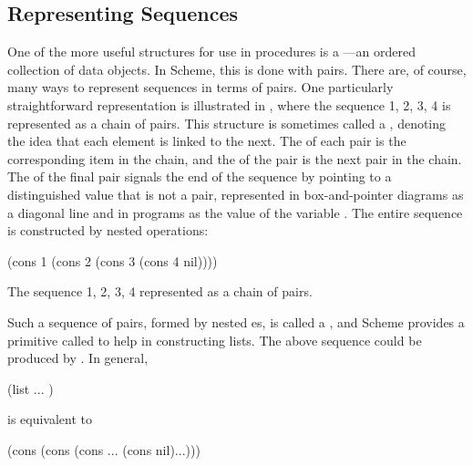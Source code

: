 \subsection{Representing Sequences}
\label{Section 2.2.1}

One of the more useful structures for use in procedures is a
---an ordered collection of data objects.  In Scheme, this is
done with pairs.  There are, of course, many ways to represent sequences in
terms of pairs.  One particularly straightforward representation is illustrated
in , where the sequence 1, 2, 3, 4 is represented as a chain
of pairs.  This structure is sometimes called a , denoting
the idea that each element is linked to the next.  The  of each pair
is the corresponding item in the chain, and the  of the pair is the
next pair in the chain.  The  of the final pair signals the end of
the sequence by pointing to a distinguished value that is not a pair,
represented in box-and-pointer diagrams as a diagonal line and in programs as
the value of the variable .  The entire sequence is constructed by
nested  operations:

\begin{codeBlock}
(cons 1
      (cons 2
            (cons 3
                  (cons 4 nil))))
\end{codeBlock}

\begin{imageFigure}{The sequence 1, 2, 3, 4 represented as a chain of pairs.}
  
\end{imageFigure}

Such a sequence of pairs, formed by nested es, is called a
, and Scheme provides a primitive called  to help in
constructing lists.  The above sequence could be produced by
.  In general,

\begin{syntaxForm}
(list   ... )
\end{syntaxForm}

\noindent
is equivalent to

\begin{syntaxForm}
(cons 
      (cons 
            (cons ...
                  (cons 
                        nil)...)))
\end{syntaxForm}

